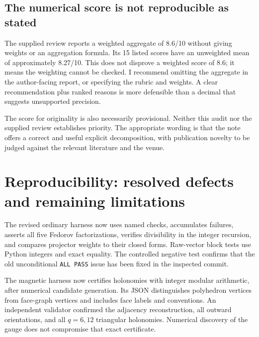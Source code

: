 \documentclass[11pt,a4paper]{article}
\begin{document}
\subsection{The numerical score is not reproducible as stated}
The supplied review reports a weighted aggregate of 8.6/10 without giving weights or an aggregation formula. Its 15 listed scores have an unweighted mean of approximately 8.27/10. This does not disprove a weighted score of 8.6; it means the weighting cannot be checked. I recommend omitting the aggregate in the author-facing report, or specifying the rubric and weights. A clear recommendation plus ranked reasons is more defensible than a decimal that suggests unsupported precision.

The score for originality is also necessarily provisional. Neither this audit nor the supplied review establishes priority. The appropriate wording is that the note offers a correct and useful explicit decomposition, with publication novelty to be judged against the relevant literature and the venue.

\section{Reproducibility: resolved defects and remaining limitations}
The revised ordinary harness now uses named checks, accumulates failures, asserts all five Fedorov factorizations, verifies divisibility in the integer recursion, and compares projector weights to their closed forms. Raw-vector block tests use Python integers and exact equality. The controlled negative test confirms that the old unconditional \texttt{ALL PASS} issue has been fixed in the inspected commit.

The magnetic harness now certifies holonomies with integer modular arithmetic, after numerical candidate generation. Its JSON distinguishes polyhedron vertices from face-graph vertices and includes face labels and conventions. An independent validator confirmed the adjacency reconstruction, all outward orientations, and all $q=6,12$ triangular holonomies. Numerical discovery of the gauge does not compromise that exact certificate.
\end{document}
